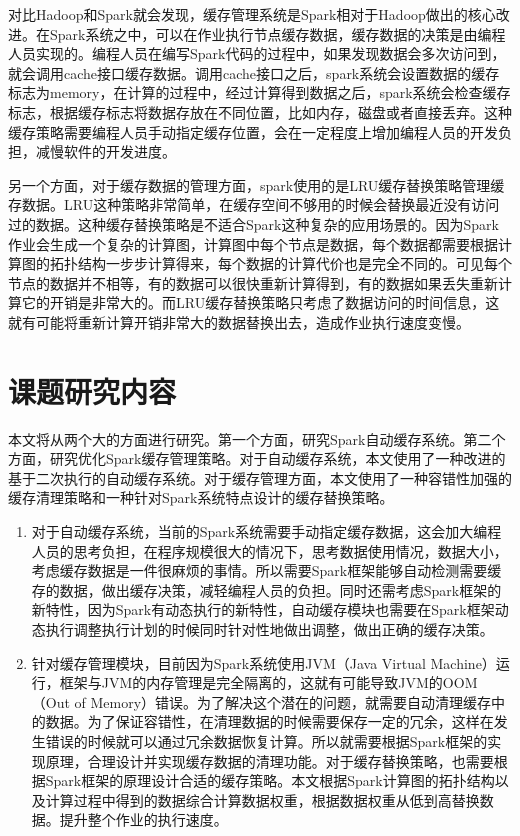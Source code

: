 对比Hadoop和Spark就会发现，缓存管理系统是Spark相对于Hadoop做出的核心改进。在Spark系统之中，可以在作业执行节点缓存数据，缓存数据的决策是由编程人员实现的。编程人员在编写Spark代码的过程中，如果发现数据会多次访问到，就会调用cache接口缓存数据。调用cache接口之后，spark系统会设置数据的缓存标志为memory，在计算的过程中，经过计算得到数据之后，spark系统会检查缓存标志，根据缓存标志将数据存放在不同位置，比如内存，磁盘或者直接丢弃。这种缓存策略需要编程人员手动指定缓存位置，会在一定程度上增加编程人员的开发负担，减慢软件的开发进度。

另一个方面，对于缓存数据的管理方面，spark使用的是LRU缓存替换策略管理缓存数据。LRU这种策略非常简单，在缓存空间不够用的时候会替换最近没有访问过的数据。这种缓存替换策略是不适合Spark这种复杂的应用场景的。因为Spark作业会生成一个复杂的计算图，计算图中每个节点是数据，每个数据都需要根据计算图的拓扑结构一步步计算得来，每个数据的计算代价也是完全不同的。可见每个节点的数据并不相等，有的数据可以很快重新计算得到，有的数据如果丢失重新计算它的开销是非常大的。而LRU缓存替换策略只考虑了数据访问的时间信息，这就有可能将重新计算开销非常大的数据替换出去，造成作业执行速度变慢。

\section{课题研究内容}

本文将从两个大的方面进行研究。第一个方面，研究Spark自动缓存系统。第二个方面，研究优化Spark缓存管理策略。对于自动缓存系统，本文使用了一种改进的基于二次执行的自动缓存系统。对于缓存管理方面，本文使用了一种容错性加强的缓存清理策略和一种针对Spark系统特点设计的缓存替换策略。

\begin{enumerate}
    \item 对于自动缓存系统，当前的Spark系统需要手动指定缓存数据，这会加大编程人员的思考负担，在程序规模很大的情况下，思考数据使用情况，数据大小，考虑缓存数据是一件很麻烦的事情。所以需要Spark框架能够自动检测需要缓存的数据，做出缓存决策，减轻编程人员的负担。同时还需考虑Spark框架的新特性，因为Spark有动态执行的新特性，自动缓存模块也需要在Spark框架动态执行调整执行计划的时候同时针对性地做出调整，做出正确的缓存决策。
    \item 针对缓存管理模块，目前因为Spark系统使用JVM（Java Virtual Machine）运行，框架与JVM的内存管理是完全隔离的，这就有可能导致JVM的OOM（Out of Memory）错误。为了解决这个潜在的问题，就需要自动清理缓存中的数据。为了保证容错性，在清理数据的时候需要保存一定的冗余，这样在发生错误的时候就可以通过冗余数据恢复计算。所以就需要根据Spark框架的实现原理，合理设计并实现缓存数据的清理功能。对于缓存替换策略，也需要根据Spark框架的原理设计合适的缓存策略。本文根据Spark计算图的拓扑结构以及计算过程中得到的数据综合计算数据权重，根据数据权重从低到高替换数据。提升整个作业的执行速度。
\end{enumerate}


